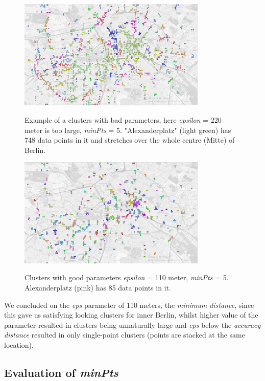 \begin{figure}[!ht]
	\centering
	\includegraphics[width=0.8\textwidth]{images/0,002_5_gray.png}\\
	\caption{ Example of a clusters with bad parameters, here \textit{epsilon} = 220 meter is too large, \textit{minPts} = 5. "Alexanderplatz" (light green) has 748 data points in it and stretches over the whole centre (Mitte) of Berlin. }
	\label{fig:002_5_gray}
\end{figure}
\begin{figure}[!ht]
	\centering
	\includegraphics[width=0.8\textwidth]{images/0,001_5_gray.png}\\
	\caption{ Clusters with good parameters \textit{epsilon} = 110 meter, \textit{minPts} = 5. Alexanderplatz (pink) has 85 data points in it.  }
	\label{fig:0.001_5_gray}
\end{figure}
We concluded on the \textit{eps} parameter of 110 meters, the \textit{minimum distance}, since this gave us satisfying looking clusters for inner Berlin, whilst higher value of the parameter resulted in clusters being unnaturally large and \textit{eps} below the \textit{accuracy distance} resulted in only single-point clusters (points are stacked at the same location). 

\subsection{Evaluation of \textit{minPts}}

